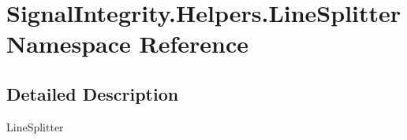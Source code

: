 \hypertarget{namespaceSignalIntegrity_1_1Helpers_1_1LineSplitter}{}\section{Signal\+Integrity.\+Helpers.\+Line\+Splitter Namespace Reference}
\label{namespaceSignalIntegrity_1_1Helpers_1_1LineSplitter}


\subsection{Detailed Description}
\begin{DoxyVerb}LineSplitter\end{DoxyVerb}
 